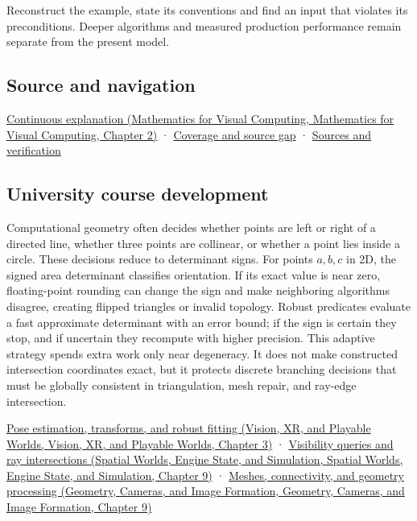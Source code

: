 Reconstruct the example, state its conventions and find an input that violates its preconditions. Deeper algorithms and measured production performance remain separate from the present model.

\subsection{Source and navigation}\label{appendix-da478be01d02-source-and-navigation}

\href{../02-Mathematics-for-Visual-Computing/main.pdf\#nameddest=01-foundations-i-ch018-keep-the-promises-visible-while-moving-between-representations}{Continuous explanation (Mathematics for Visual Computing, Mathematics for Visual Computing, Chapter 2)} · \hyperref[appendix-fd090d982a15-phase-7---parts-601-700]{Coverage and source gap} · \hyperref[appendix-a103e7846d21-phase-7---source-analysis-and-verification]{Sources and verification}

\subsection{University course development}\label{appendix-da478be01d02-university-course-development}

Computational geometry often decides whether points are left or right of a directed line, whether three points are collinear, or whether a point lies inside a circle. These decisions reduce to determinant signs. For points \(a,b,c\) in 2D, the signed area determinant classifies orientation. If its exact value is near zero, floating-point rounding can change the sign and make neighboring algorithms disagree, creating flipped triangles or invalid topology. Robust predicates evaluate a fast approximate determinant with an error bound; if the sign is certain they stop, and if uncertain they recompute with higher precision. This adaptive strategy spends extra work only near degeneracy. It does not make constructed intersection coordinates exact, but it protects discrete branching decisions that must be globally consistent in triangulation, mesh repair, and ray-edge intersection.

\href{../07-Vision-XR-and-Playable-Worlds/main.pdf\#nameddest=04-visual-computing-ii-ch032-pose-estimation-transforms-and-robust-fitting}{Pose estimation, transforms, and robust fitting (Vision, XR, and Playable Worlds, Vision, XR, and Playable Worlds, Chapter 3)} · \href{../05-Spatial-Worlds-Engine-State-and-Simulation/main.pdf\#nameddest=04-visual-computing-ii-ch028-visibility-queries-and-ray-intersections-1}{Visibility queries and ray intersections (Spatial Worlds, Engine State, and Simulation, Spatial Worlds, Engine State, and Simulation, Chapter 9)} · \href{../03-Geometry-Cameras-and-Image-Formation/main.pdf\#nameddest=03-visual-computing-i-ch002-meshes-connectivity-and-geometry-processing}{Meshes, connectivity, and geometry processing (Geometry, Cameras, and Image Formation, Geometry, Cameras, and Image Formation, Chapter 9)}
